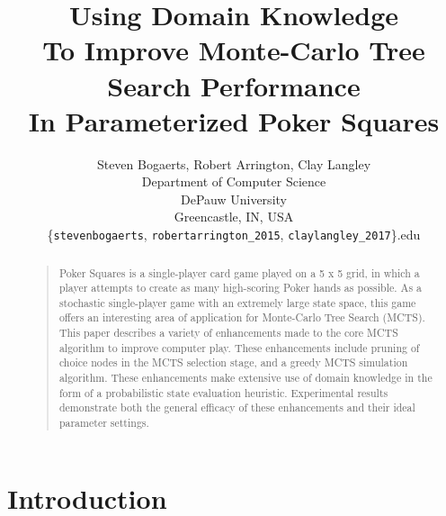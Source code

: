 \documentclass[letterpaper]{article}
\begin{document}
%
\title{Using Domain Knowledge\\To Improve Monte-Carlo Tree Search Performance\\In Parameterized Poker Squares}    %
\author{Steven Bogaerts, Robert Arrington, Clay Langley\\
Department of Computer Science\\
DePauw University\\
Greencastle, IN, USA\\
\{{\tt stevenbogaerts}, {\tt robertarrington\_2015}, {\tt claylangley\_2017}\}{\tt@depauw.edu}
}
\maketitle
\begin{abstract}
\begin{quote}
Poker Squares is a single-player card game played on a 5 x 5 grid, in which a player attempts to create as many high-scoring Poker hands as possible. As a stochastic single-player game with an extremely large state space, this game offers an interesting area of application for Monte-Carlo Tree Search (MCTS). This paper describes a variety of enhancements made to the core MCTS algorithm to improve computer play. These enhancements include pruning of choice nodes in the MCTS selection stage, and a greedy MCTS simulation algorithm. These enhancements make extensive use of domain knowledge in the form of a probabilistic state evaluation heuristic. Experimental results demonstrate both the general efficacy of these enhancements and their ideal parameter settings.
\end{quote}
\end{abstract}

\section{Introduction}

\end{document}
